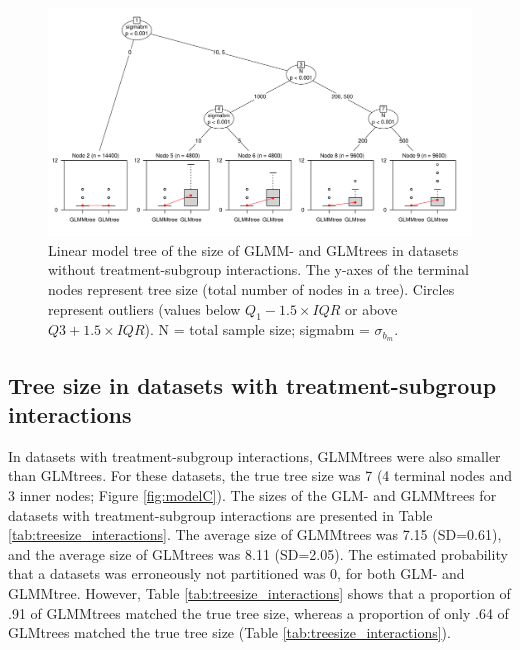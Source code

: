 \documentclass[nobf,doc]{apa}
\begin{document}
\begin{figure}
	\includegraphics[width=20cm]{treesize_mob_maxdepth=4_nointeract.pdf}
	\caption{Linear model tree of the size of GLMM- and GLMtrees in datasets without treatment-subgroup interactions. The y-axes of the terminal nodes represent tree size (total number of nodes in a tree). Circles represent outliers (values below $Q_1 - 1.5 \times IQR$ or above $Q3 + 1.5 \times IQR$). N = total sample size; sigmabm = $\sigma_{b_m}$.}
	\label{fig:treesizetree_nointeract}
\end{figure}




\subsection{Tree size in datasets with treatment-subgroup interactions}

In datasets with treatment-subgroup interactions, GLMMtrees were also smaller than GLMtrees. For these datasets, the true tree size was 7 (4 terminal nodes and 3 inner nodes; Figure \ref{fig:modelC}). The sizes of the GLM- and GLMMtrees for datasets with treatment-subgroup interactions are presented in Table \ref{tab:treesize_interactions}. The average size of GLMMtrees was 7.15 (SD=0.61), and the average size of GLMtrees was 8.11 (SD=2.05). The estimated probability that a datasets was erroneously not partitioned was 0, for both GLM- and GLMMtree. However, Table \ref{tab:treesize_interactions} shows that a proportion of .91 of GLMMtrees matched the true tree size, whereas a proportion of only .64 of GLMtrees matched the true tree size (Table \ref{tab:treesize_interactions}).
\end{document}
